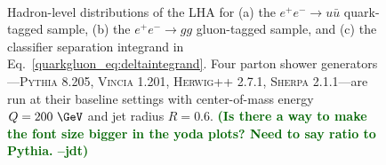 \documentclass[11pt]{cernrep}
\newcommand{\jdt}[1]{\textbf{\textcolor{darkgreen}{(#1 --jdt)}}}
\begin{document}
\begin{figure}
\centering
{}
$\qquad$

\caption{Hadron-level distributions of the LHA for (a) the $e^+ e^- \to u \bar{u}$ quark-tagged sample, (b) the $e^+ e^- \to gg$ gluon-tagged sample, and (c) the classifier separation integrand in Eq.~\eqref{quarkgluon_eq:deltaintegrand}.  Four parton shower generators---\textsc{Pythia 8.205}, \textsc{Vincia 1.201}, \textsc{Herwig++ 2.7.1}, \textsc{Sherpa 2.1.1}---are run at their baseline settings with center-of-mass energy $Q = 200~\GeV$ and jet radius $R= 0.6$.  \jdt{Is there a way to make the font size bigger in the yoda plots?  Need to say ratio to Pythia.}}
\label{quarkgluon_fig:LHA_hadron}
\end{figure}
\end{document}
